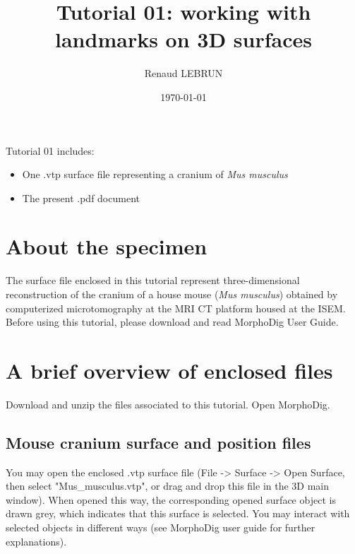 \documentclass[12pt, a4paper]{book}
\title{Tutorial 01: working with landmarks on 3D surfaces}
\author{Renaud LEBRUN}
\affil{Institut des Sciences de l'Evolution, Université de Montpellier, France}
\date{\today}
\begin{document}
	\dominitoc

\maketitle


\faketableofcontents



\minitoc 
Tutorial 01 includes:
\begin{itemize}
\item One .vtp surface file representing a cranium of \textit{Mus musculus}
\item The present .pdf document
\end{itemize}





\section{About the specimen}

The surface file enclosed in this tutorial represent three-dimensional reconstruction of the cranium of a house mouse (\textit{Mus musculus}) obtained by computerized microtomography at the MRI \si{\micro}CT platform housed at the ISEM.
Before using this tutorial, please download and read MorphoDig User Guide.


\section{A brief overview of enclosed files}
		Download and unzip the files associated to this tutorial. Open MorphoDig.
\subsection{Mouse cranium surface and position files}
	You may open the enclosed .vtp surface file (File -> Surface -> Open Surface, then select "Mus\_musculus.vtp", or drag and drop this file in the 3D main window). When opened
this way, the corresponding opened surface object is drawn grey, which indicates that this surface
is selected. You may interact with selected objects in different ways (see MorphoDig user guide for
further explanations).\\
\end{document}
